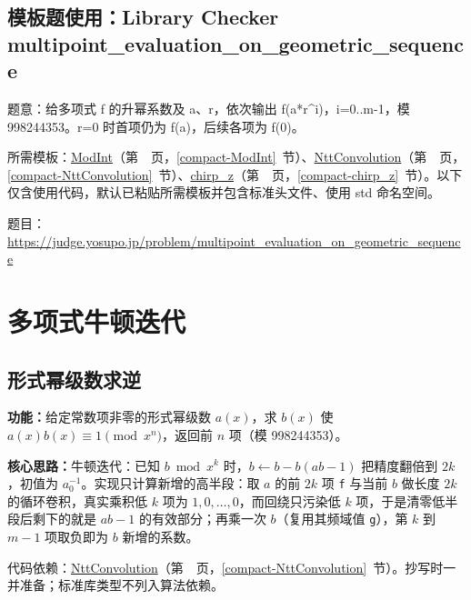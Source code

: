 \Needspace{331pt}

\subsection*{模板题使用：Library Checker multipoint\_evaluation\_on\_geometric\_sequence}

\label{usage-example-31}

题意：给多项式 f 的升幂系数及 a、r，依次输出 f(a*r\textasciicircum{}i)，i=0..m-1，模 998244353。r=0 时首项仍为 f(a)，后续各项为 f(0)。

所需模板：\hyperref[compact-ModInt]{ModInt}（第~\pageref{compact-ModInt}~页，\ref{compact-ModInt}~节）、\hyperref[compact-NttConvolution]{NttConvolution}（第~\pageref{compact-NttConvolution}~页，\ref{compact-NttConvolution}~节）、\hyperref[compact-chirp_z]{chirp\_\allowbreak{}z}（第~\pageref{compact-chirp_z}~页，\ref{compact-chirp_z}~节）。以下仅含使用代码，默认已粘贴所需模板并包含标准头文件、使用 std 命名空间。

题目：\url{https://judge.yosupo.jp/problem/multipoint_evaluation_on_geometric_sequence}



\Needspace{606pt}

\section{多项式牛顿迭代}

\subsection{形式幂级数求逆}\label{compact-FpsInverse}

\noindent\textbf{功能：}\allowbreak 给定常数项非零的形式幂级数 $a(x)$，求 $b(x)$ 使 $a(x)b(x)\equiv1\pmod{x^n}$，返回前 $n$ 项（模 998244353）。

\textbf{核心思路：}\allowbreak 牛顿迭代：已知 $b\bmod x^k$ 时，$b\leftarrow b-b(ab-1)$ 把精度翻倍到 $2k$，初值为 $a_0^{-1}$。实现只计算新增的高半段：取 $a$ 的前 $2k$ 项 \texttt{f} 与当前 $b$ 做长度 $2k$ 的循环卷积，真实乘积低 $k$ 项为 $1,0,\dots,0$，而回绕只污染低 $k$ 项，于是清零低半段后剩下的就是 $ab-1$ 的有效部分；再乘一次 $b$（复用其频域值 \texttt{g}），第 $k$ 到 $m-1$ 项取负即为 $b$ 新增的系数。

代码依赖：\hyperref[compact-NttConvolution]{NttConvolution}（第~\pageref{compact-NttConvolution}~页，\ref{compact-NttConvolution}~节）。抄写时一并准备；标准库类型不列入算法依赖。

